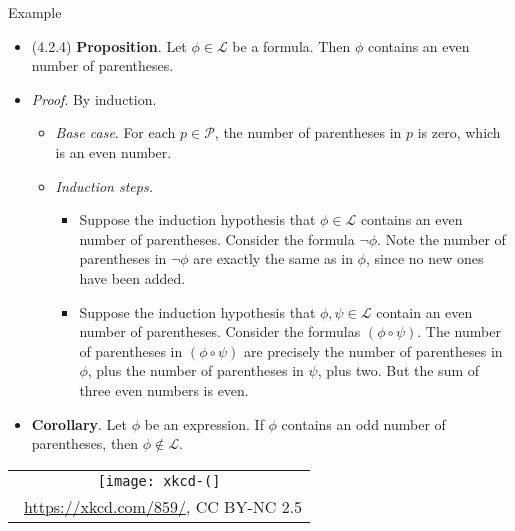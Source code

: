 \documentclass[../slides.tex]{subfiles}
\begin{document}
\begin{frame}{Example}


	\begin{itemize}
	
		\item (4.2.4) \textbf{Proposition}. Let $\phi\in\mathcal{L}$ be a formula. Then $\phi$ contains an even number of parentheses.
		
		\item \emph{Proof}. By induction. 
				
		\begin{itemize}
	
		\item \emph{Base case}. For each $p\in\mathcal{P}$, the number of parentheses in $p$ is zero, which is an even number.
		
		\item \emph{Induction steps.}
		
		\begin{itemize}
		
			\item Suppose the induction hypothesis that $\phi\in\mathcal{L}$ contains an even number of parentheses. Consider the formula $\neg\phi$. Note the number of parentheses in $\neg\phi$ are exactly the same as in $\phi$, since no new ones have been added.
			
			\item Suppose the induction hypothesis that $\phi,\psi\in\mathcal{L}$ contain an even number of parentheses. Consider the formulas $(\phi\circ\psi)$. The number of parentheses in $(\phi\circ\psi)$ are precisely the number of parentheses in $\phi$, plus the number of parentheses in $\psi$, plus two.	 But the sum of three even numbers is even.	
		\end{itemize}
	
	\end{itemize}
		
	\item \textbf{Corollary}. Let $\phi$ be an expression. If $\phi$ contains an odd number of parentheses, then $\phi\notin\mathcal{L}$.
	
	\end{itemize}


\end{frame}

\begin{frame}

\begin{center}
		\begin{tabular}{c}
		\texttt{[image: xkcd-(]}\\[-1ex]
		{\tiny \textcopyright~\url{https://xkcd.com/859/}, CC BY-NC 2.5}
		\end{tabular}
		\end{center}

\end{frame}
\end{document}

